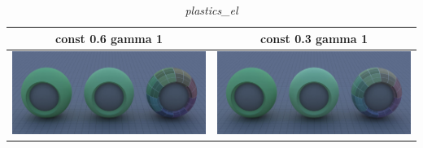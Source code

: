 \documentclass[11pt]{article}
\begin{document}
\begin{table}[ht]
  \centering
  \begin{tabular}{ | c | c | }
    \hline
    const 0.6 gamma 1 & const 0.3 gamma 1 \\ \hline
    \begin{minipage}{.3\textwidth}
      \includegraphics[scale=0.1]{img/obj/plastics_el/plastics_el_disney_dc03_dg1.jpg}
    \end{minipage}
    &
    \begin{minipage}{.3\textwidth}
      \includegraphics[scale=0.1]{img/obj/plastics_el/plastics_el_disney_dg1.jpg}
    \end{minipage}
    \\ \hline
  \end{tabular}
  \caption{\textit{plastics\_el}}\label{tbl:myLboro}
\end{table}
\end{document}
